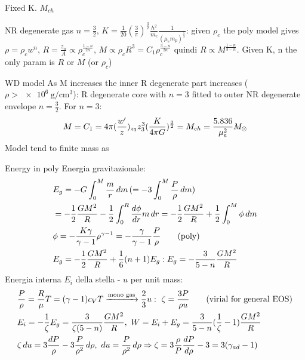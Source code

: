 \begin{frame}{Fixed K. $M_{ch}$}
\begin{block}{NR degenerate \Pelectron gas}
$n=\frac{3}{2}$, $K=\frac{1}{20}(\frac{3}{\pi})^{\frac{3}{2}}\frac{h^2}{m_e}\frac{1}{(\mu_em_p)^{\frac{5}{3}}}$: given $\rho_c$ the poly model gives $\rho=\rho_cw^n$, $R=\frac{z_n}{A}\propto\rho_c^{\frac{1-n}{2n}}$, $M\propto\rho_cR^3=C_1\rho_c^{\frac{3-n}{2n}}$ quindi $R\propto M^{\frac{1-n}{3-n}}$. Given K, n the only param is $R$ or $M$ (or $\rho_c$)
\end{block}
\begin{block}{WD model}
As M increases the inner R degenerate part increases ($\rho>\SI{e6}{\gram\per\cubic\cm}$): R degenerate core with $n=3$ fitted to outer NR degenerate envelope $n=\frac{3}{2}$. For $n=3$:
\begin{align*}
M=C_1=4\pi(\frac{w'}{z})_{z_3}z_3^3(\frac{K}{4\pi G})^{\frac{3}{2}}=M_{ch}=\frac{5.836}{\mu_e^2}M_{\odot}
\end{align*}
Model tend to finite mass as 
\end{block}
\end{frame}

\begin{frame}{Energy in poly}
Energia gravitazionale:
\begin{align*}
&E_g=-G\int_0^M\frac{m}{r}\,dm\, (=-3\int_0^M\frac{P}{\rho}\, dm)\\
&=-\frac{1}{2}\frac{GM^2}{R}-\frac{1}{2}\int_0^R\frac{d \phi}{d r}m\,dr=-\frac{1}{2}\frac{GM^2}{R}+\frac{1}{2}\int_0^M\phi\,dm\\
&\phi=-\frac{K\gamma}{\gamma-1}\rho^{\gamma-1}=-\frac{\gamma}{\gamma-1}\frac{P}{\rho}\tag{poly}\\
&E_g=-\frac{1}{2}\frac{GM^2}{R}+\frac{1}{6}(n+1)E_g: E_g=-\frac{3}{5-n}\frac{GM^2}{R}
\end{align*}
Energia interna $E_i$ della stella - $u$ per unit mass:
\begin{align*}
&\frac{P}{\rho}=\frac{R}{\mu}T=(\gamma-1)c_VT\xrightarrow{\text{mono gas}}\frac{2}{3}u:\ \zeta=\frac{3P}{\rho u}\tag{virial for general EOS}\\
&E_i=-\frac{1}{\zeta}E_g=\frac{3}{\zeta(5-n)}\frac{GM^2}{R},\ W=E_i+E_g=\frac{3}{5-n}(\frac{1}{\zeta}-1)\frac{GM^2}{R}\\
&\zeta\,du=3\frac{dP}{\rho}-3\frac{P}{\rho^2}\,d\rho,\ du=\frac{P}{\rho^2}\,d\rho\Rightarrow\zeta=3\frac{\rho}{P}\TDy{\rho}{P}-3=3(\gamma_{ad}-1)
\end{align*}
\end{frame}

